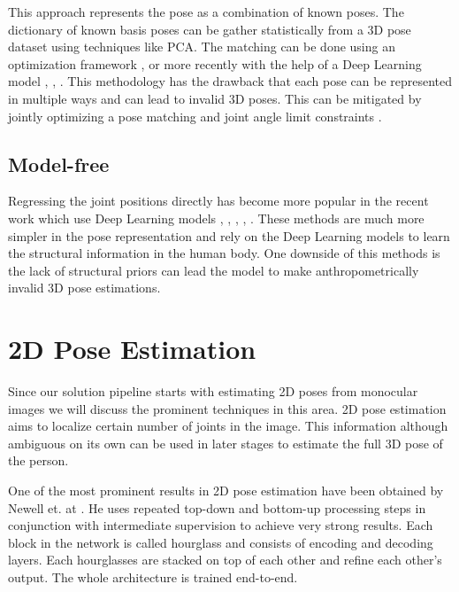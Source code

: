 This approach represents the pose as a combination of known poses. The dictionary of known basis poses can be gather statistically from a 3D pose dataset using techniques like PCA. The matching can be done using an optimization framework  \parencite{ramakrishna2012reconstructing}, \parencite{zhou20153d} or more recently with the help of a Deep Learning model \parencite{zhou2016sparseness}, \parencite{chen20173d}, \parencite{tome2017lifting}. This methodology has the drawback that each pose can be represented in multiple ways and can lead to invalid 3D poses. This can be mitigated by jointly optimizing a pose matching and joint angle limit constraints \parencite{akhter2015pose}.

\subsection{Model-free}

Regressing the joint positions directly has become more popular in the recent work which use Deep Learning models , \parencite{pavlakos2017coarse}, \parencite{martinez2017simple}, \parencite{hossain2017exploiting}, \parencite{tekin2017learning}. These methods are much more simpler in the pose representation and rely on the Deep Learning models to learn the structural information in the human body. One downside of this methods is the lack of structural priors can lead the model to make anthropometrically invalid 3D pose estimations.

\section{2D Pose Estimation}

Since our solution pipeline starts with estimating 2D poses from monocular images we will discuss the prominent techniques in this area. 2D pose estimation aims to localize certain number of joints in the image. This information although ambiguous on its own can be used in later stages to estimate the full 3D pose of the person.

One of the most prominent results in 2D pose estimation have been obtained by Newell et. at \parencite{newell2016stacked}. He uses repeated top-down and bottom-up processing steps in conjunction with intermediate supervision to achieve very strong results. Each block in the network is called hourglass and consists of encoding and decoding layers. Each hourglasses are stacked on top of each other and refine each other's output. The whole architecture is trained end-to-end.

